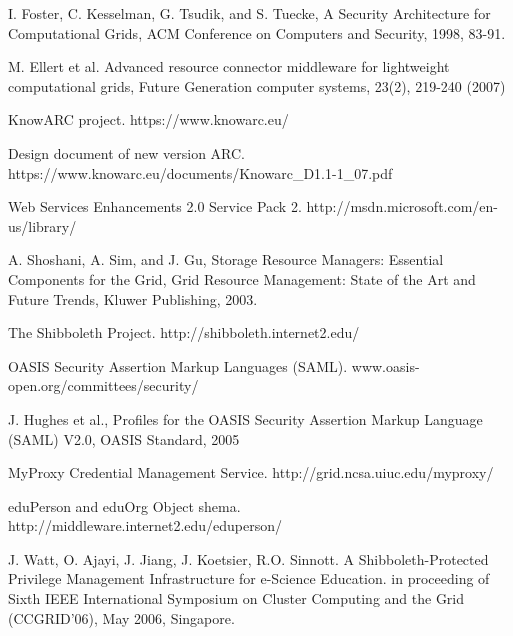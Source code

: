 \documentclass[conference]{IEEEtran}
\begin{document}
\begin{thebibliography}{99}

I. Foster, C. Kesselman, G. Tsudik, and S. Tuecke, A Security Architecture for 
Computational Grids, ACM Conference on Computers and Security, 1998, 83-91.

M. Ellert et al. Advanced resource connector middleware for lightweight computational 
grids, Future Generation computer systems, 23(2), 219-240 (2007)

KnowARC project.  https://www.knowarc.eu/

Design document of new version ARC. https://www.knowarc.eu/documents/Knowarc\_D1.1-1\_07.pdf

Web Services Enhancements 2.0 Service Pack 2. http://msdn.microsoft.com/en-us/library/

A. Shoshani, A. Sim, and J. Gu, Storage Resource Managers: Essential Components for the Grid, 
Grid Resource Management: State of the Art and Future Trends, Kluwer Publishing, 2003.

The Shibboleth Project. http://shibboleth.internet2.edu/

OASIS Security Assertion Markup Languages (SAML).
www.oasis-open.org/committees/security/

J. Hughes et al., Profiles for the OASIS Security Assertion Markup
Language (SAML) V2.0, OASIS Standard, 2005

MyProxy Credential Management Service. http://grid.ncsa.uiuc.edu/myproxy/

eduPerson and eduOrg Object shema. http://middleware.internet2.edu/eduperson/

% 
% 
% 
% 
% 
% 
J. Watt, O. Ajayi, J. Jiang, J. Koetsier, R.O. Sinnott. A Shibboleth-Protected 
Privilege Management Infrastructure for e-Science Education. in proceeding of Sixth 
IEEE International Symposium on Cluster Computing and the Grid (CCGRID'06), May 2006,
Singapore.


\end{thebibliography}
\end{document}
